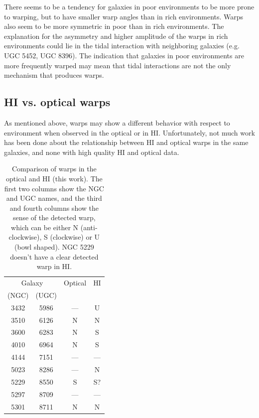 \documentclass{aa}
\begin{document}
There seems to be a tendency for galaxies in
poor environments to be more prone 
to warping, but to have smaller warp angles than in rich
environments. Warps also seem to be more symmetric in poor than in rich
environments. The explanation for the asymmetry and higher amplitude
of the warps in rich environments could lie in the tidal
interaction with neighboring galaxies (e.g. UGC 5452, UGC
8396). The indication that galaxies in poor environments are more
frequently warped may mean that tidal interactions are not the only
mechanism that produces warps. 

\subsection{HI vs. optical warps}

As mentioned above, warps may show a different behavior with
respect to environment when observed in the optical or in
HI. Unfortunately, not much work has been done about the relationship
between HI and optical warps in the same galaxies, and none with high
quality HI and optical 
data. 

\begin{center}
\begin{table}
\begin{center}
\begin{tabular}{cccc}
\hline
\multicolumn{2}{c}{ Galaxy}   &     Optical  &  HI  \\
 (NGC) & (UGC) &              &                     \\
\hline
3432     & 5986      &  --- & U       \\
3510     & 6126      &  N   & N       \\
3600     & 6283      &  N   & S       \\
4010     & 6964      &  N   & S       \\
4144     & 7151      &  --- & ---     \\
5023     & 8286      &  --- & N       \\
5229     & 8550      &  S   & S?      \\
5297     & 8709      &  --- & ---     \\
5301     & 8711      &  N   & N       \\
\hline
\end{tabular}
\caption{Comparison of warps in the optical \cite{ss} and HI (this
  work). The first two columns show the NGC and UGC names, and the
  third and fourth columns show the sense of the detected warp, which
  can be either N (anti-clockwise), S (clockwise) or U (bowl
  shaped). NGC 5229 doesn't have a clear detected warp in HI. }
\label{tab:ss}
\end{center}
\end{table}
\end{center}
\end{document}
